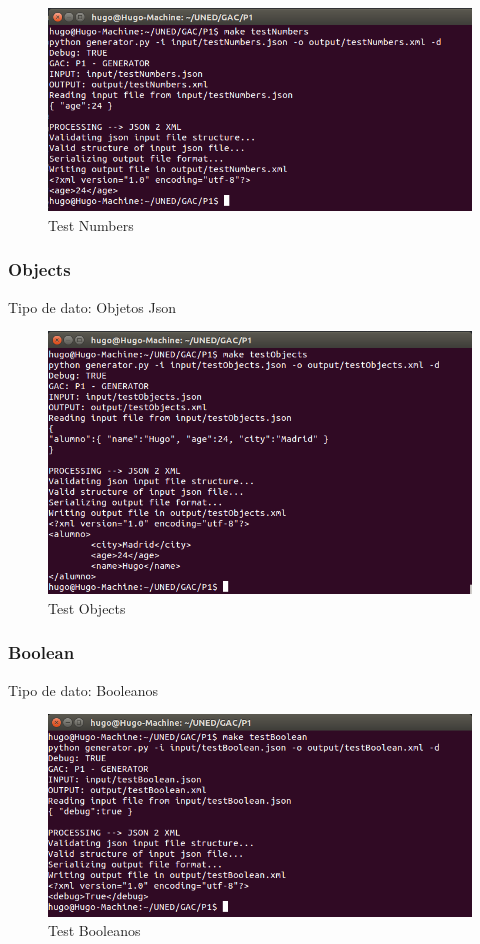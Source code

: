 \documentclass[a4paper,11pt]{book}
\begin{document}
\begin{figure}[H]  
\centering 
\includegraphics[scale=0.35]{imagenes/testNumbers.png}
\caption{ Test Numbers  }  
\end{figure} 

\subsubsection{Objects}
Tipo de dato: Objetos Json

\begin{figure}[H]  
\centering 
\includegraphics[scale=0.35]{imagenes/testObjects.png}
\caption{ Test Objects  }  
\end{figure} 

\subsubsection{Boolean}
Tipo de dato: Booleanos

\begin{figure}[H]  
\centering 
\includegraphics[scale=0.35]{imagenes/testBoolean.png}
\caption{ Test Booleanos  }  
\end{figure} 
\end{document}
